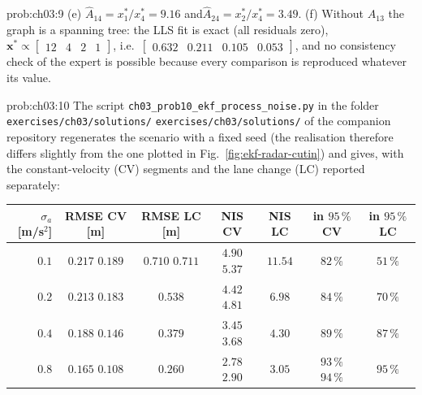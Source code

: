 \documentclass[graybox,envcountchap]{style/SNmono}
\newcommand{\repopath}[1]{\texttt{#1}}
\providecommand{\DIFadd}[1]{{\protect\color{blue} #1}} %
\providecommand{\DIFdel}[1]{{\protect\color{red} #1}} %
\providecommand{\DIFaddbegin}{} %
\providecommand{\DIFaddend}{} %
\providecommand{\DIFdelbegin}{} %
\providecommand{\DIFdelend}{} %
\begin{document}
\begin{sol}{prob:ch03:9}
(e) $\widehat{A}_{14}=x_1^{*}/x_4^{*}=9.16$ and\DIFaddbegin \allowbreak \DIFaddend $\widehat{A}_{24}=x_2^{*}/x_4^{*}=3.49$.
(f) Without $A_{13}$ the graph is a spanning tree: the LLS fit is exact (all residuals zero), $\bm{x}^{*}\propto\begin{bmatrix}12&4&2&1\end{bmatrix}$, i.e.\ $\begin{bmatrix}0.632&0.211&0.105&0.053\end{bmatrix}$, and no consistency check of the expert is possible because every comparison is reproduced whatever its value.
\end{sol}

\begin{sol}{prob:ch03:10}
The script \repopath{ch03\_\allowbreak prob10\_\allowbreak ekf\_\allowbreak process\_\allowbreak noise.py} in the folder \DIFdelbegin \DIFdel{\repopath{exercises/\allowbreak ch03/\allowbreak solutions/} }\DIFdelend \DIFaddbegin \DIFadd{\repopath{exercises/\allowbreak ch03/\allowbreak solutions/\allowbreak } }\DIFaddend of the companion repository regenerates the scenario with a fixed seed (the realisation therefore differs slightly from the one plotted in Fig.~\ref{fig:ekf-radar-cutin}) and gives, with the constant-velocity (CV) segments and the lane change (LC) reported separately:
\begin{center}
\footnotesize
\setlength{\tabcolsep}{4pt}
\begin{tabular}{r cc cc cc}
\hline
$\sigma_a$ [m/s$^{2}$] & RMSE CV [m] & RMSE LC [m] & NIS CV & NIS LC & in $95\,\%$ CV & in $95\,\%$ LC\\
\hline
$0.1$ & \DIFdelbegin \DIFdel{$0.217$ }\DIFdelend \DIFaddbegin \DIFadd{$0.189$ }\DIFaddend & \DIFdelbegin \DIFdel{$0.710$ }\DIFdelend \DIFaddbegin \DIFadd{$0.711$ }\DIFaddend & \DIFdelbegin \DIFdel{$4.90$ }\DIFdelend \DIFaddbegin \DIFadd{$5.37$ }\DIFaddend & $11.54$ & $82\,\%$ & $51\,\%$\\
$0.2$ & \DIFdelbegin \DIFdel{$0.213$ }\DIFdelend \DIFaddbegin \DIFadd{$0.183$ }\DIFaddend & $0.538$ & \DIFdelbegin \DIFdel{$4.42$ }\DIFdelend \DIFaddbegin \DIFadd{$4.81$ }\DIFaddend & $6.98$ & $84\,\%$ & $70\,\%$\\
$0.4$ & \DIFdelbegin \DIFdel{$0.188$ }\DIFdelend \DIFaddbegin \DIFadd{$0.146$ }\DIFaddend & $0.379$ & \DIFdelbegin \DIFdel{$3.45$ }\DIFdelend \DIFaddbegin \DIFadd{$3.68$ }\DIFaddend & $4.30$ & $89\,\%$ & $87\,\%$\\
$0.8$ & \DIFdelbegin \DIFdel{$0.165$ }\DIFdelend \DIFaddbegin \DIFadd{$0.108$ }\DIFaddend & $0.260$ & \DIFdelbegin \DIFdel{$2.78$ }\DIFdelend \DIFaddbegin \DIFadd{$2.90$ }\DIFaddend & $3.05$ & \DIFdelbegin \DIFdel{$93\,\%$ }\DIFdelend \DIFaddbegin \DIFadd{$94\,\%$ }\DIFaddend & $95\,\%$\\

\end{tabular}
\end{center}
\end{sol}
\end{document}
